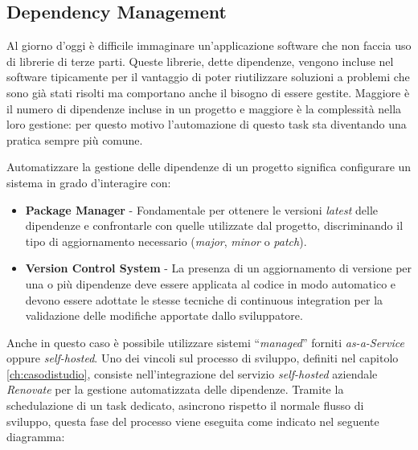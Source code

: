 \subsection{Dependency Management}
Al giorno d'oggi è difficile immaginare un'applicazione software che non faccia uso di librerie di terze parti.
Queste librerie, 
dette dipendenze, 
vengono incluse nel software tipicamente per il vantaggio di poter riutilizzare soluzioni a problemi che sono già stati risolti ma comportano anche il bisogno di essere gestite. 
Maggiore è il numero di dipendenze incluse in un progetto e maggiore è la complessità nella loro gestione: 
per questo motivo l’automazione di questo task sta diventando una pratica sempre più comune.

Automatizzare la gestione delle dipendenze di un progetto significa configurare un sistema in grado d'interagire con:

\begin{itemize}
    \item \textbf{Package Manager} - Fondamentale per ottenere le versioni \textit{latest} delle dipendenze e confrontarle con quelle utilizzate dal progetto, discriminando il tipo di aggiornamento necessario (\textit{major}, \textit{minor} o \textit{patch}).
    
    \item \textbf{Version Control System} - La presenza di un aggiornamento di versione per una o più dipendenze deve essere applicata al codice in modo automatico e devono essere adottate le stesse tecniche di continuous integration per la validazione delle modifiche apportate dallo sviluppatore.
\end{itemize}

Anche in questo caso è possibile utilizzare sistemi ``\textit{managed}'' forniti \textit{as-a-Service} oppure \textit{self-hosted}. 
Uno dei vincoli sul processo di sviluppo,
definiti nel capitolo \ref{ch:casodistudio},
consiste nell'integrazione del servizio \textit{self-hosted} aziendale \textit{Renovate} per la gestione automatizzata delle dipendenze.
Tramite la schedulazione di un task dedicato, 
asincrono rispetto il normale flusso di sviluppo, 
questa fase del processo viene eseguita come indicato nel seguente diagramma:

